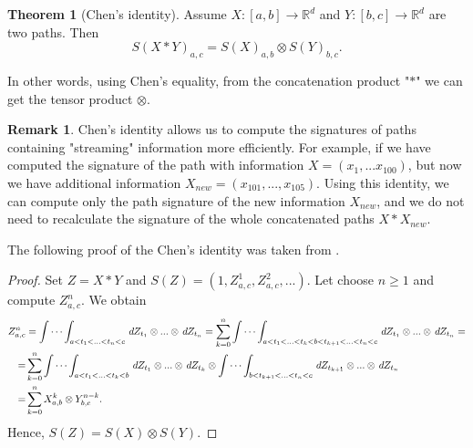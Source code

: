 \documentclass[12pt,a4paper]{report}
\theoremstyle{definition}
\newtheorem{theorem}{Theorem}
\newtheorem{remark}{Remark}
\begin{document}
\begin{theorem}[Chen's identity]
	Assume $X:[a, b] \rightarrow \mathbb{R}^d$ and $Y: [b,c] \rightarrow \mathbb{R}^d $ are two paths.
	Then 
	\begin{equation}
		S(X * Y)_{a,c} = S(X)_{a,b} \otimes S(Y )_{b,c}.
	\end{equation}

	
\end{theorem}

In other words, using Chen's equality, from the concatenation product "$*$" we can get the tensor product $\otimes$.
\begin{remark}
	Chen's identity allows us to compute the signatures of paths containing "streaming" information more efficiently. For example, if we have computed the signature of the path with information $X=(x_1, ... x_{100})$, but now we have additional information $X_{new}=(x_{101},...,x_{105})$. Using this identity, we can compute only the path signature of the new information $X_{new}$, and we do not need to recalculate the signature of the whole concatenated paths $X\ast X_{new}$.
\end{remark}

The following proof of the Chen's identity was taken from \parencite{lyons2007differential}.

\begin{proof}
	Set $Z=X*Y$ and $S(Z)=(1,Z_{a,c}^1,Z_{a,c}^2,...)$. Let choose $n\geq 1$ and compute $Z_{a,c}^n$. We obtain 
	\begin{equation*}
		\begin{aligned}
			Z_{a,c}^n&=\idotsint_{a<t_1<...<t_n<c}\,dZ_{t_1}\otimes...\otimes\,dZ_{t_n}= 	\sum_{k=0}^n\idotsint_{a<t_1<...<t_k<b<t_{k+1}<...<t_n<c}\,dZ_{t_1}\otimes...\otimes\,dZ_{t_n}=\\=&\sum_{k=0}^n\idotsint_{a<t_1<...<t_k<b}\,dZ_{t_1}\otimes...\otimes\,dZ_{t_k}\otimes\idotsint_{b<t_{k+1}<...<t_n<c}\,dZ_{t_{k+1}}\otimes...\otimes\,dZ_{t_n} \\ =&\sum_{k=0}^n X_{a,b}^k\otimes Y_{b,c}^{n-k}.
		\end{aligned}
	\end{equation*}
Hence, $S(Z)=S(X)\otimes S(Y)$.

\end{proof}
\end{document}
